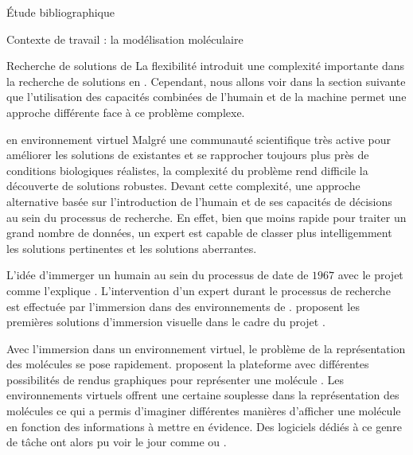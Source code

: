 \documentclass[myfrancais,ngerman,english,french]{mythesis}
\begin{document}
\begin{mychapter}{Étude bibliographique}
\begin{mysection}{Contexte de travail : la modélisation moléculaire}
\begin{mysubsection}{Recherche de solutions de }
				La flexibilité introduit une complexité importante dans la recherche de solutions en .
				Cependant, nous allons voir dans la section suivante que l'utilisation des capacités combinées de l'humain et de la machine permet une approche différente face à ce problème complexe.
			\end{mysubsection}
			\begin{mysubsection}{ en environnement virtuel}
				Malgré une communauté scientifique très active pour améliorer les solutions de  existantes et se rapprocher toujours plus près de conditions biologiques réalistes, la complexité du problème rend difficile la découverte de solutions robustes.
				Devant cette complexité, une approche alternative basée sur l'introduction de l'humain et de ses capacités de décisions au sein du processus de recherche.
				En effet, bien que moins rapide pour traiter un grand nombre de données, un expert est capable de classer plus intelligemment les solutions pertinentes et les solutions aberrantes.

				L'idée d'immerger un humain au sein du processus de  date de $1967$ avec le projet \myGROPE comme l'explique .
				L'intervention d'un expert durant le processus de recherche est effectuée par l'immersion dans des environnements de .
				 proposent les premières solutions d'immersion visuelle dans le cadre du projet \myGROPE.

				Avec l'immersion dans un environnement virtuel, le problème de la représentation des molécules se pose rapidement.
				 proposent la plateforme \myVIEW avec différentes possibilités de rendus graphiques pour représenter une molécule .
				Les environnements virtuels offrent une certaine souplesse dans la représentation des molécules ce qui a permis d'imaginer différentes manières d'afficher une molécule en fonction des informations à mettre en évidence.
				Des logiciels dédiés à ce genre de tâche ont alors pu voir le jour comme   ou \myPyMOL {}.

				\begin{myfigure}
				\end{myfigure}


\end{mysubsection}
\end{mysection}
\end{mychapter}
\end{document}
